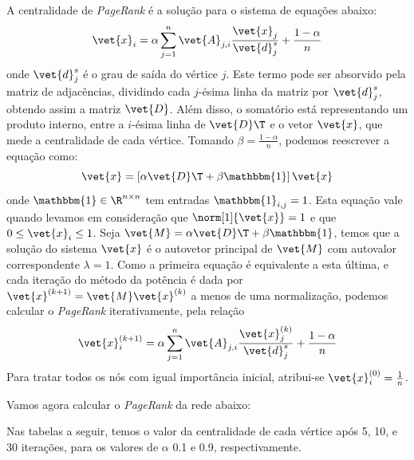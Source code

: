 \documentclass[l15, tikzdraw]{homework}
\begin{document}
	\subquest{}%
	A centralidade de \textit{PageRank} é a solução para o sistema de equações abaixo:
		$$\vet{x}_i = \alpha \sum_{j = 1}^n \vet{A}_{j, i} \frac{\vet{x}_j}{\vet{d}^s_j} + \frac{1 - \alpha}{n}$$
	onde $\vet{d}^s_j$ é o grau de saída do vértice $j$. Este termo pode ser absorvido pela matriz de adjacências, dividindo cada $j$-ésima linha da matriz por $\vet{d}^s_j$, obtendo assim a matriz $\vet{D}$. Além disso, o somatório está representando um produto interno, entre a $i$-ésima linha de $\vet{D}\T$ e o vetor $\vet{x}$, que mede a centralidade de cada vértice. Tomando $\beta = \frac{1 - \alpha}{n}$, podemos reescrever a equação como:
		$$\vet{x} = \left[\alpha \vet{D}\T + \beta \mathbbm{1} \right] \vet{x}$$
	onde $\mathbbm{1} \in \R^{n \times n}$ tem entradas $\mathbbm{1}_{i,j} = 1$. Esta equação vale quando levamos em consideração que $\norm[1]{\vet{x}} = 1$ e que $0 \le \vet{x}_i \le 1$. Seja $\vet{M} = \alpha \vet{D}\T + \beta \mathbbm{1}$, temos que a solução do sistema $\vet{x}$ é o autovetor principal de $\vet{M}$ com autovalor correspondente $\lambda = 1$. Como a primeira equação é equivalente a esta última, e cada iteração do método da potência é dada por $\vet{x}^{(k + 1)} = \vet{M} \vet{x}^{(k)}$ a menos de uma normalização, podemos calcular o \textit{PageRank} iterativamente, pela relação
	$$\vet{x}^{(k + 1)}_i = \alpha \sum_{j = 1}^n \vet{A}_{j, i} \frac{\vet{x}^{(k)}_j}{\vet{d}^s_j} + \frac{1 - \alpha}{n}$$
	Para tratar todos os nós com igual importância inicial, atribui-se $\vet{x}_i^{(0)} = \frac{1}{n}$.

	\subquest{}%
	Vamos agora calcular o \textit{PageRank} da rede abaixo:
	
	\begin{fig}
		
	\end{fig}

	Nas tabelas a seguir, temos o valor da centralidade de cada vértice após 5, 10, e 30 iterações, para os valores de $\alpha$ 0.1 e 0.9, respectivamente.
\end{document}
